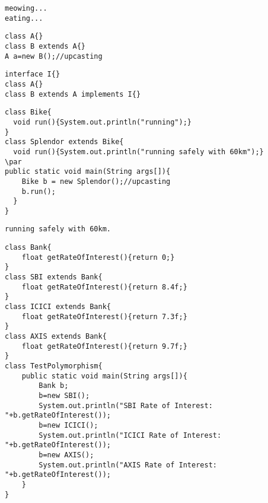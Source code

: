 \documentclass{book}
\def\lthtmlcheckvsize{\ifdim\ht\sizebox<\vsize 
  \ifdim\wd\sizebox<\hsize\expandafter\hfill\fi \expandafter\vfill
  \else\expandafter\vss\fi}%
\begin{document}
{\newpage\clearpage
{}%
\begin{lstlisting}
meowing...
eating...
\end{lstlisting}%
\lthtmlfigureZ
\lthtmlcheckvsize\clearpage}

{\newpage\clearpage
{}%
\begin{lstlisting}
class A{}  
class B extends A{}  
A a=new B();//upcasting  
\end{lstlisting}%
\lthtmlfigureZ
\lthtmlcheckvsize\clearpage}

{\newpage\clearpage
{}%
\begin{lstlisting}
interface I{}  
class A{}  
class B extends A implements I{}  
\end{lstlisting}%
\lthtmlfigureZ
\lthtmlcheckvsize\clearpage}

{\newpage\clearpage
{}%
\begin{lstlisting}
class Bike{  
  void run(){System.out.println("running");}  
}  
class Splendor extends Bike{  
  void run(){System.out.println("running safely with 60km");}  
\par
public static void main(String args[]){  
    Bike b = new Splendor();//upcasting  
    b.run();  
  }  
}  
\end{lstlisting}%
\lthtmlfigureZ
\lthtmlcheckvsize\clearpage}

{\newpage\clearpage
{}%
\begin{lstlisting}
running safely with 60km.
\end{lstlisting}%
\lthtmlfigureZ
\lthtmlcheckvsize\clearpage}

{\newpage\clearpage
{}%
\begin{lstlisting}
class Bank{  
	float getRateOfInterest(){return 0;}  
}  
class SBI extends Bank{  
	float getRateOfInterest(){return 8.4f;}  
}  
class ICICI extends Bank{  
	float getRateOfInterest(){return 7.3f;}  
}  
class AXIS extends Bank{  
	float getRateOfInterest(){return 9.7f;}  
}  
class TestPolymorphism{  
	public static void main(String args[]){  
		Bank b;  
		b=new SBI();  
		System.out.println("SBI Rate of Interest: "+b.getRateOfInterest());  
		b=new ICICI();  
		System.out.println("ICICI Rate of Interest: "+b.getRateOfInterest());  
		b=new AXIS();  
		System.out.println("AXIS Rate of Interest: "+b.getRateOfInterest());  
	}  
}  
\end{lstlisting}%
\lthtmlfigureZ
\lthtmlcheckvsize\clearpage}
\end{document}
